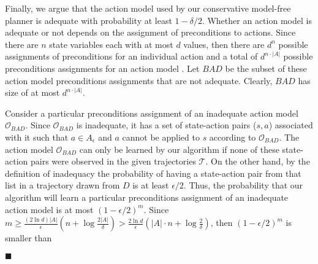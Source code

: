 \documentclass[letterpaper]{article}
\newenvironment{proof}{\noindent{\bf Proof:~~}}{\qed}
\newcommand{\qed}{\hfill\ensuremath{\blacksquare}}
\begin{document}
\begin{proof}
Finally, we argue that the action model used by our conservative model-free planner is adequate with probability at least $1-\delta/2$. 
Whether an action model is adequate or not depends on the assignment of preconditions to actions. 
Since there are $n$ state variables each with at most $d$ values, 
then there are $d^n$ possible assignments of preconditions for an individual action
and a total of $d^{n\cdot |A|}$ possible preconditions assignments for an action model . 
Let $BAD$ be the subset of these action model preconditions assignments that are not adequate. 
Clearly, $BAD$ has size of at most $d^{n\cdot |A|}$. 


Consider a particular preconditions assignment of an inadequate action model $\mathcal{O}_{BAD}$. Since $\mathcal{O}_{BAD}$ is inadequate, 
it has a set of state-action pairs ($s,a$) associated with it such that $a\in A_\epsilon$ and $a$ cannot be applied to $s$ according to $\mathcal{O}_{BAD}$. 
The action model $\mathcal{O}_{BAD}$ can only be learned by our algorithm 
if none of these state-action pairs were observed in the given trajectories $\mathcal{T}$. 
On the other hand, by the definition of inadequacy
the probability of having a state-action pair from that list 
in a trajectory drawn from $D$ is at least $\epsilon/2$. 
Thus, the probability that our algorithm will learn a particular preconditions assignment of an inadequate action model is at most $(1-\epsilon/2)^m$.
Since $m\geq\frac{(2\ln  d)|A|}{\epsilon}(n+\log\frac{2|A|}{\delta})>\frac{2\ln d}{\epsilon}(|A|\cdot n+\log\frac{2}{\delta})$, then $(1-\epsilon/2)^m$ is smaller than 




\end{proof}
\end{document}
